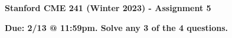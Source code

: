 \documentclass[12pt]{exam}
\begin{document}
\begin{center}
{\large {\bf Stanford CME 241 (Winter 2023) - Assignment 5}}
\end{center}
 
{\large{\bf Due: 2/13 @ 11:59pm. Solve any 3 of the 4 questions.}}
\begin{questions}
%
%
%


\end{questions}
\end{document}
